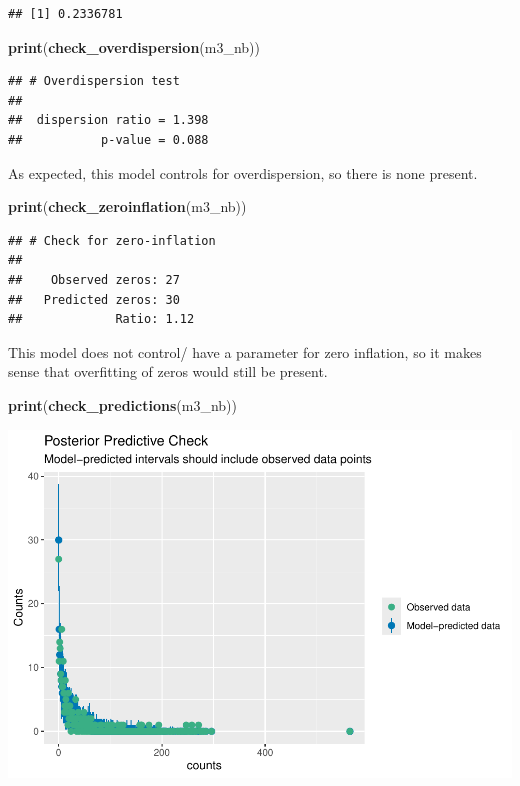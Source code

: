 \documentclass[
]{article}
\newenvironment{Shaded}{\begin{snugshade}}{\end{snugshade}}
\newcommand{\FunctionTok}[1]{\textcolor[rgb]{0.13,0.29,0.53}{\textbf{#1}}}
\newcommand{\NormalTok}[1]{#1}
\begin{document}
\begin{verbatim}
## [1] 0.2336781
\end{verbatim}

\begin{Shaded}
\begin{Highlighting}[]
\FunctionTok{print}\NormalTok{(}\FunctionTok{check\_overdispersion}\NormalTok{(m3\_nb))}
\end{Highlighting}
\end{Shaded}

\begin{verbatim}
## # Overdispersion test
## 
##  dispersion ratio = 1.398
##           p-value = 0.088
\end{verbatim}

As expected, this model controls for overdispersion, so there is none
present.

\begin{Shaded}
\begin{Highlighting}[]
\FunctionTok{print}\NormalTok{(}\FunctionTok{check\_zeroinflation}\NormalTok{(m3\_nb))}
\end{Highlighting}
\end{Shaded}

\begin{verbatim}
## # Check for zero-inflation
## 
##    Observed zeros: 27
##   Predicted zeros: 30
##             Ratio: 1.12
\end{verbatim}

This model does not control/ have a parameter for zero inflation, so it
makes sense that overfitting of zeros would still be present.

\begin{Shaded}
\begin{Highlighting}[]
\FunctionTok{print}\NormalTok{(}\FunctionTok{check\_predictions}\NormalTok{(m3\_nb))}
\end{Highlighting}
\end{Shaded}

\includegraphics{hw1-lobstrs-eds241_files/figure-latex/unnamed-chunk-19-1.pdf}
\end{document}
